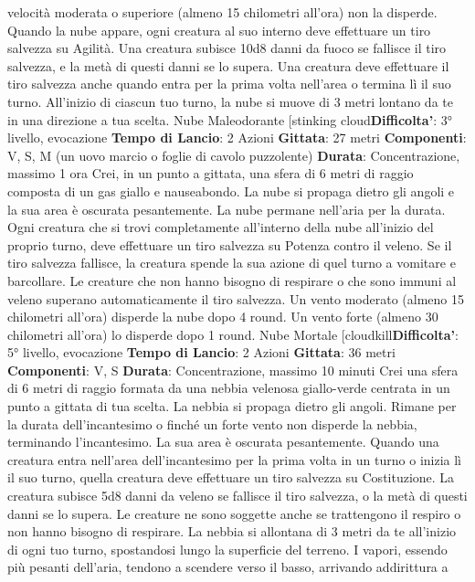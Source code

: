 \begin{multicols}{2}
velocità moderata o superiore (almeno 15 chilometri
all’ora) non la disperde.
Quando la nube appare, ogni creatura al suo interno
deve effettuare un tiro salvezza su Agilità. Una
creatura subisce 10d8 danni da fuoco se fallisce il tiro
salvezza, e la metà di questi danni se lo supera. Una
creatura deve effettuare il tiro salvezza anche quando
entra per la prima volta nell’area o termina lì il suo
turno.
All’inizio di ciascun tuo turno, la nube si muove di 3
metri lontano da te in una direzione a tua scelta.
Nube Maleodorante
[stinking cloud\textbf{Difficolta'}:
3° livello, evocazione
\textbf{Tempo di Lancio}: 2 Azioni
\textbf{Gittata}: 27 metri
\textbf{Componenti}: V, S, M (un uovo marcio o foglie di
cavolo puzzolente)
\textbf{Durata}: Concentrazione, massimo 1 ora
Crei, in un punto a gittata, una sfera di 6 metri di raggio
composta di un gas giallo e nauseabondo. La nube si
propaga dietro gli angoli e la sua area è oscurata
pesantemente. La nube permane nell’aria per la durata.
Ogni creatura che si trovi completamente all’interno
della nube all’inizio del proprio turno, deve effettuare un
tiro salvezza su Potenza contro il veleno. Se il tiro
salvezza fallisce, la creatura spende la sua azione di
quel turno a vomitare e barcollare. Le creature che non
hanno bisogno di respirare o che sono immuni al veleno
superano automaticamente il tiro salvezza.
Un vento moderato (almeno 15 chilometri all’ora)
disperde la nube dopo 4 round. Un vento forte (almeno
30 chilometri all’ora) lo disperde dopo 1 round.
Nube Mortale
[cloudkill\textbf{Difficolta'}:
5° livello, evocazione
\textbf{Tempo di Lancio}: 2 Azioni
\textbf{Gittata}: 36 metri
\textbf{Componenti}: V, S
\textbf{Durata}: Concentrazione, massimo 10 minuti
Crei una sfera di 6 metri di raggio formata da una
nebbia velenosa giallo-verde centrata in un punto a
gittata di tua scelta. La nebbia si propaga dietro gli
angoli. Rimane per la durata dell’incantesimo o finché
un forte vento non disperde la nebbia, terminando
l’incantesimo. La sua area è oscurata pesantemente.
Quando una creatura entra nell’area dell’incantesimo
per la prima volta in un turno o inizia lì il suo turno,
quella creatura deve effettuare un tiro salvezza su
Costituzione. La creatura subisce 5d8 danni da veleno
se fallisce il tiro salvezza, o la metà di questi danni se lo
supera. Le creature ne sono soggette anche se
trattengono il respiro o non hanno bisogno di respirare.
La nebbia si allontana di 3 metri da te all’inizio di ogni
tuo turno, spostandosi lungo la superficie del terreno. I
vapori, essendo più pesanti dell’aria, tendono a
scendere verso il basso, arrivando addirittura a

\end{multicols}
